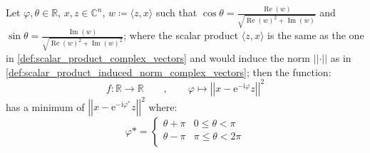 





	\begin{Prop}\label{theorem:min distance}
		Let $\varphi, \theta \in \mathbb{R}$, $x,z \in \mathbb{C}^n$, $w \coloneqq \langle z,x \rangle$ such that 
    $\cos\theta = \frac{\operatorname{Re}(w)}{\sqrt{\operatorname{Re}(w)^2+\operatorname{Im}(w)}}$ and $\sin\theta = \frac{\operatorname{Im}(w)}{\sqrt{\operatorname{Re}(w)^2+\operatorname{Im}(w)^2}}$;  where the scalar product $\langle z,x \rangle$ is the same as the one in \cref{def:scalar_product_complex_vectors} 
    and would induce the norm $\left|\left|\cdot\right|\right|$ as in \cref{def:scalar_product_induced_norm_complex_vectors}; then the function:
		\begin{equation}\label{eq:loss_function}
			f \colon \mathbb{R}\to\mathbb{R} \qquad , \qquad \varphi\mapsto \left|\left|x-\mathrm{e}^{-\mathrm{i}\varphi}z\right|\right|^2
		\end{equation}
		has a minimum of $\left|\left|x-\mathrm{e}^{-\mathrm{i}\varphi^*}z\right|\right|^2$ where:
    \begin{equation}
      \varphi* =
      \begin{cases}
			  \theta + \pi & 0   \leq \theta <  \pi\\
			  \theta - \pi & \pi \leq \theta < 2\pi\\
		  \end{cases}
    \end{equation}
  \end{Prop}
